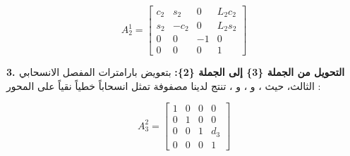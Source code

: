 \begin{equation}
A_2^1 = 
\begin{bmatrix}
c_2 & s_2 & 0 & L_2 c_2 \\
s_2 & -c_2 & 0 & L_2 s_2 \\
0 & 0 & -1 & 0 \\
0 & 0 & 0 & 1
\end{bmatrix}
\label{eq:A21}
\end{equation}

\textbf{3. التحويل من الجملة \{3\} إلى الجملة \{2\}:}
بتعويض بارامترات المفصل الانسحابي الثالث، حيث ، و ، و ، تنتج لدينا مصفوفة تمثل انسحاباً خطياً نقياً على المحور :

\begin{equation}
A_3^2 = 
\begin{bmatrix}
1 & 0 & 0 & 0 \\
0 & 1 & 0 & 0 \\
0 & 0 & 1 & d_3 \\
0 & 0 & 0 & 1
\end{bmatrix}
\label{eq:A32}
\end{equation}